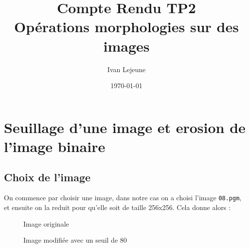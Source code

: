 \documentclass[french,a4paper,10pt]{article}
\title{Compte Rendu TP2\\Opérations morphologies sur des images}
\author{Ivan Lejeune}
\date{\today}
\begin{document}
	\maketitle

	\tableofcontents

	\newpage
	\section{Seuillage d'une image et erosion de l'image binaire}\label{sec:1}

	\subsection{Choix de l'image}

	On commence par choisir une image, dans notre cas on a choisi l'image \texttt{08.pgm}, et ensuite on la reduit pour
	qu'elle soit de taille 256x256. Cela donne alors :

	\begin{figure}[!htb]
		\begin{minipage}{0.48\textwidth}
			\centering
			\caption{Image originale}\label{Fig:orig-08}
		\end{minipage}\hfill
		\begin{minipage}{0.48\textwidth}
			\centering
			\caption{Image modifiée avec un seuil de 80}\label{Fig:test-grey-08}
		\end{minipage}
	\end{figure}
\end{document}
